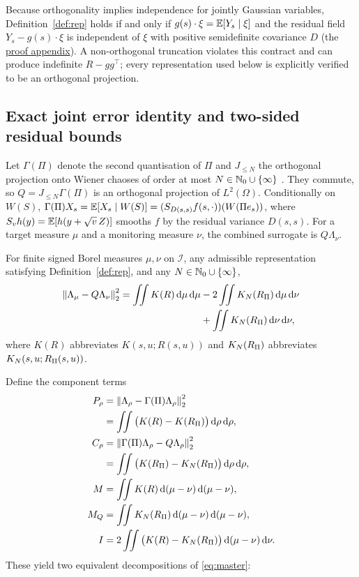 Because orthogonality implies independence for jointly Gaussian variables, Definition~\ref{def:rep} holds
if and only if $g(s)\cdot\xi=\mathbb{E}[Y_s\mid\xi]$ and the residual field $Y_s-g(s)\cdot\xi$ is independent of
$\xi$ with positive semidefinite covariance $D$ (the \hyperref[app:proofs]{proof appendix}). A non-orthogonal truncation
violates this contract and can produce indefinite $R-gg^\top$; every representation used below is
explicitly verified to be an orthogonal projection.

\subsection{Exact joint error identity and two-sided residual bounds}\label{sec:ledger}
Let $\Gamma(\Pi)$ denote the second quantisation of $\Pi$ and $J_{\le N}$ the orthogonal projection onto
Wiener chaoses of order at most $N\in\mathbb{N}_0\cup\{\infty\}$ \citep{Janson1997,Nualart2006}. They commute, so
$Q=J_{\le N}\Gamma(\Pi)$ is an orthogonal projection of $L^2(\Omega)$. Conditionally on $W(S)$,
$\Gamma(\Pi)X_s=\mathbb{E}[X_s\mid W(S)]=(S_{D(s,s)}f(s,\cdot))(W(\Pi e_s))$, where $S_v h(y)=\mathbb{E}[h(y+\sqrt{v}\,Z)]$
smooths $f$ by the residual variance $D(s,s)$. For a target measure $\mu$ and a monitoring measure $\nu$,
the combined surrogate is $Q\Lambda_\nu$.

\begin{theorem}\label{thm:master}
For finite signed Borel measures $\mu,\nu$ on $\mathcal{I}$, any admissible representation satisfying
Definition~\ref{def:rep}, and any $N\in\mathbb{N}_0\cup\{\infty\}$,
\begin{equation}\label{eq:master}
\begin{split}
  \left\lVert \Lambda_\mu-Q\Lambda_\nu\right\rVert_2^2
  =\iint K(R)\,\mathrm{d}\mu\,\mathrm{d}\mu&-2\iint K_N(R_\Pi)\,\mathrm{d}\mu\,\mathrm{d}\nu\\
  &+\iint K_N(R_\Pi)\,\mathrm{d}\nu\,\mathrm{d}\nu,
\end{split}
\end{equation}
where $K(R)$ abbreviates $K(s,u;R(s,u))$ and $K_N(R_\Pi)$ abbreviates $K_N(s,u;R_\Pi(s,u))$.
\end{theorem}

Define the component terms
\begin{align*}
  P_\rho&=\left\lVert \Lambda_\rho-\Gamma(\Pi)\Lambda_\rho\right\rVert_2^2\\
  &=\iint\big(K(R)-K(R_\Pi)\big)\,\mathrm{d}\rho\,\mathrm{d}\rho,\\
  C_\rho&=\left\lVert \Gamma(\Pi)\Lambda_\rho-Q\Lambda_\rho\right\rVert_2^2\\
  &=\iint\big(K(R_\Pi)-K_N(R_\Pi)\big)\,\mathrm{d}\rho\,\mathrm{d}\rho,\\
  M&=\iint K(R)\,\mathrm{d}(\mu-\nu)\,\mathrm{d}(\mu-\nu),\\
  M_Q&=\iint K_N(R_\Pi)\,\mathrm{d}(\mu-\nu)\,\mathrm{d}(\mu-\nu),\\
  I&=2\iint\big(K(R)-K_N(R_\Pi)\big)\,\mathrm{d}(\mu-\nu)\,\mathrm{d}\nu.
\end{align*}
These yield two equivalent decompositions of \eqref{eq:master}:

